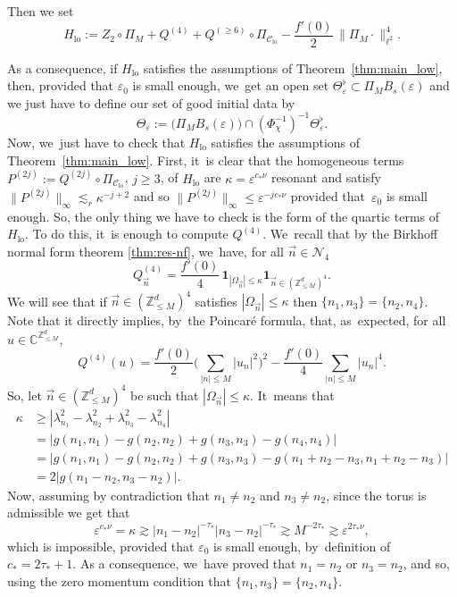 \documentclass[JEP,XML,SOM,Unicode,published]{cedram}
\theoremstyle{plain}
\theoremstyle{definition}
\DeclareMathOperator{\lo}{lo}
\newcommand{\1}{\mathbf{1}}
\newcommand{\Clo}{\mathscr{C}_{\lo}}
\begin{document}
Then we set
\begin{equation}
\label{eq:defHlo}
H_{\lo} := Z_2\circ \Pi_M + Q^{(4)} + Q^{(\geq 6)} \circ \Pi_{\Clo} -\frac{f'(0)}2\, \| \Pi_{M} \cdot\|_{\ell^2}^4.
\end{equation}

As a consequence, if $H_{\lo} $ satisfies the assumptions of Theorem~\ref{thm:main_low}, then, provided that $\varepsilon_{0}$ is small enough, we~get an open set
$
\Theta_{\varepsilon}^\flat \subset \Pi_{M} B_s(\varepsilon)
$
and we just have to define our set of good initial data by
\begin{equation}
\label{eq:def_lens_des_condinit}
\Theta_{\varepsilon} := \big(\Pi_{ M } B_s(\varepsilon) \big)\cap (\Phi_{\chi}^{-1})^{-1} \Theta_{\varepsilon}^\flat.
\end{equation}
Now, we~just have to check that $H_{\lo} $ satisfies the assumptions of Theorem~\ref{thm:main_low}. First, it~is clear that the homogeneous terms $P^{(2j)} := Q^{(2j)} \circ \Pi_{\Clo}$, $j\geq 3$, of $H_{\lo} $ are $\kappa = \varepsilon^{c_\ast \nu}$ resonant and satisfy $\| P^{(2j)} \|_{\infty} \lesssim_r \kappa^{-j+2}$ and so $\| P^{(2j)} \|_{\infty} \leq \varepsilon^{-jc_\ast \nu}$ provided that~$\varepsilon_0$ is small enough. So, the only thing we have to check is the form of the quartic terms of~$H_{\lo}$. To do this, it~is enough to compute $Q^{(4)}$. We~recall that by the Birkhoff normal form theorem \ref{thm:res-nf}, we~have, for all $\vec{n} \in \mathcal{N}_4$
\[
Q^{(4)}_{\vec{n}} = \frac{f'(0)}4\, \mathbf{1}_{|\Omega_{\vec{n}}|\leq \kappa} \mathbf{1}_{\vec{n} \in (\mathbb{Z}^d_{\leq M})^4}.
\]
We will see that if $\vec{n} \in (\mathbb{Z}^d_{\leq M})^4$ satisfies $|\Omega_{\vec{n}}|\leq \kappa$ then $\{ n_1,n_3\} = \{n_2,n_4\}$. Note that it directly implies, by~the Poincaré formula, that, as~expected, for all $u\in \mathbb{C}^{\mathbb{Z}^d_{\leq M}}$,
\[
Q^{(4)}(u) = \frac{f'(0)}2 \Big(\sum_{|n|\leq M} |u_n|^2 \Big)^2 - \frac{f'(0)}4 \sum_{|n|\leq M} |u_n|^4.
\]
So, let $\vec{n} \in (\mathbb{Z}^d_{\leq M})^4$ be such that $|\Omega_{\vec{n}}|\leq \kappa$. It~means that
\begin{equation*}
\begin{split}
\kappa &\geq |\lambda_{n_1}^2 - \lambda_{n_2}^2 + \lambda_{n_3}^2 - \lambda_{n_4}^2| \\
&= |g(n_1,n_1) - g(n_2,n_2) + g(n_3,n_3) - g(n_4,n_4) | \\
&= |g(n_1,n_1) - g(n_2,n_2) + g(n_3,n_3) - g(n_1+n_2-n_3,n_1+n_2-n_3) | \\
&= 2|g(n_1-n_2,n_3-n_2)|.
\end{split}
\end{equation*}
Now, assuming by contradiction that $n_1\neq n_2$ and $n_3\neq n_2$, since the torus is admissible we get that
\[
\varepsilon^{ c_\ast \nu} = \kappa \gtrsim |n_1-n_2|^{-\tau_\ast} |n_3-n_2|^{-\tau_\ast} \gtrsim M^{-2\tau_\ast} \gtrsim \varepsilon^{2\tau_\ast \nu},
\]
which is impossible, provided that $\varepsilon_0$ is small enough, by~definition of $c_\ast = 2\tau_\ast+1$.
As a consequence, we~have proved that $n_1 = n_2$ or $n_3= n_2$, and so, using the zero momentum condition that $\{ n_1,n_3\} = \{n_2,n_4\}$.
\end{document}
